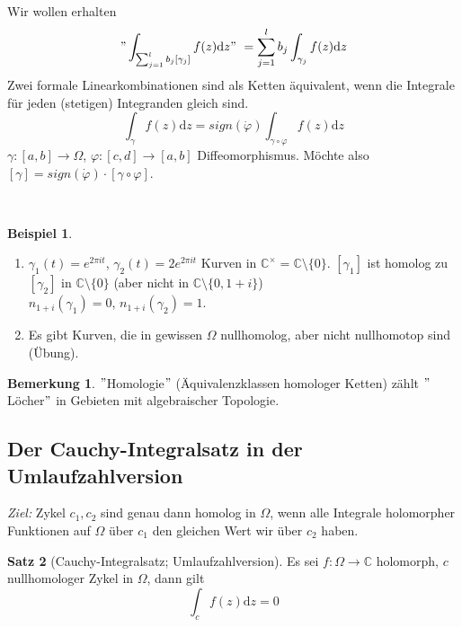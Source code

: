 \documentclass[11pt,titlepage]{article}
\theoremstyle{definition}
\newtheorem{theorem}{Satz}[section]
\newtheorem{example}[theorem]{Beispiel}
\newtheorem{remark}{Bemerkung}
\theoremstyle{remark}
\begin{document}
	\ \\
	
	Wir wollen erhalten 
	\[ "\int_{\sum_{j=1}^l b_j [\gamma_j]}f(z)\mathrm{d}z"\  = \sum_{j=1}^l b_j \int_{\gamma_j}f(z)\mathrm{d}z \]
	Zwei formale Linearkombinationen sind als Ketten äquivalent, wenn die Integrale für jeden (stetigen) 
	Integranden gleich sind. 
	\[ \int_{\gamma}f(z)\mathrm{d}z=sign(\dot{\varphi})\int_{\gamma\circ\varphi}f(z)\mathrm{d}z \]
	$\gamma:[a,b]\to\Omega$, $\varphi:[c,d]\to[a,b]$ Diffeomorphismus. Möchte also $[\gamma]=
	sign(\dot{\varphi})\cdot [\gamma\circ\varphi]$.
	
	\ \\
	
	\begin{example}
		\begin{enumerate}
			\item $\gamma_1(t)=e^{2\pi it}$, $\gamma_2(t)=2e^{2\pi it}$ Kurven in $\mathbb{C}^{\times}
			=\mathbb{C}\setminus\{0\}$. $[\gamma_1]$ ist homolog zu $[\gamma_2]$ in $\mathbb{C}
			\setminus\{0\}$ (aber nicht in $\mathbb{C}\setminus\{0,1+i\}$) \\$n_{1+i}(\gamma_1)=0$, 
			$n_{1+i}(\gamma_2)=1$.
			
			\item Es gibt Kurven, die in gewissen $\Omega$ nullhomolog, aber nicht nullhomotop sind 
			(Übung).
		\end{enumerate}
	\end{example}
	
	\begin{remark}
		$"$Homologie$"$ (Äquivalenzklassen homologer Ketten) zählt $"$Löcher$"$ in Gebieten mit 
		algebraischer Topologie.
	\end{remark}
	
	\subsection{Der Cauchy-Integralsatz in der Umlaufzahlversion}
	
	\textsl{Ziel:} Zykel $c_1, c_2$ sind genau dann homolog in $\Omega$, wenn alle Integrale holomorpher 
	Funktionen auf $\Omega$ über $c_1$ den gleichen Wert wir über $c_2$ haben.
	
	\begin{theorem}[Cauchy-Integralsatz; Umlaufzahlversion] \label{thm:CI;umlauf}
		Es sei $f:\Omega\to\mathbb{C}$ holomorph, $c$ nullhomologer Zykel in $\Omega$, dann gilt
		\[ \int_c f(z)\mathrm{d}z=0 \]
	\end{theorem}
	
\end{document}
